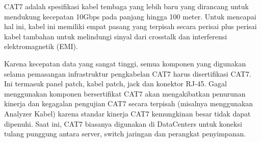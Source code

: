 CAT7 adalah spesifikasi kabel tembaga yang lebih baru yang dirancang untuk mendukung kecepatan 10Gbps pada panjang hingga 100 meter. Untuk mencapai hal ini, kabel ini memiliki empat pasang yang terpisah secara perisai plus perisai kabel tambahan untuk melindungi sinyal dari crosstalk dan interferensi elektromagnetik (EMI).

Karena kecepatan data yang sangat tinggi, semua komponen yang digunakan selama pemasangan infrastruktur pengkabelan CAT7 harus disertifikasi CAT7. Ini termasuk panel patch, kabel patch, jack dan konektor RJ-45. Gagal menggunakan komponen bersertifikat CAT7 akan mengakibatkan penurunan kinerja dan kegagalan pengujian CAT7 secara terpisah (misalnya menggunakan Analyzer Kabel) karena standar kinerja CAT7 kemungkinan besar tidak dapat dipenuhi. Saat ini, CAT7 biasanya digunakan di DataCenters untuk koneksi tulang punggung antara server, switch jaringan dan perangkat penyimpanan.






